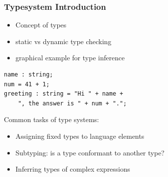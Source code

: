 \begin{frame}
  \frametitle{Typesystem Introduction}
  \begin{itemize}
    \item Concept of types
    \item static vs dynamic type checking
  \end{itemize}

  \begin{itemize}
    \item graphical example for type inference
   \end{itemize}

\begin{small}
\begin{verbatim}
name : string;
num = 41 + 1;
greeting : string = "Hi " + name + 
    ", the answer is " + num + ".";
\end{verbatim}
\end{small}

Common tasks of type systems:

\begin{itemize}
  \item Assigning fixed types to language elements
  \item Subtyping: is a type conformant to another type?
  \item Inferring types of complex expressions
\end{itemize}

\end{frame}

